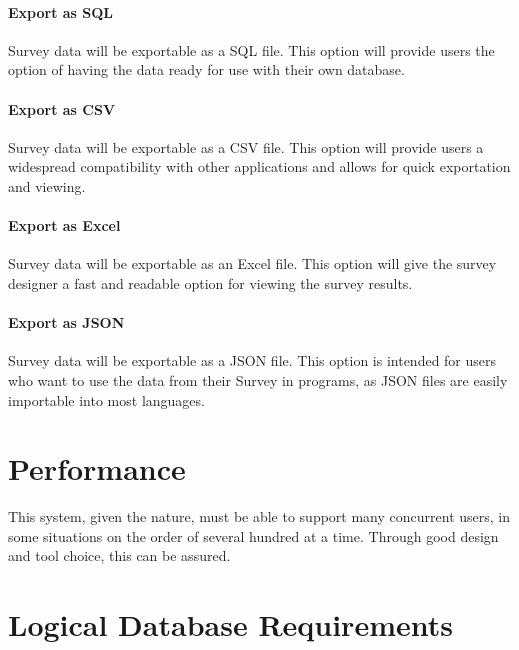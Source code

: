 \documentclass[10pt,letter]{report}
\def\hl#1{#1}
\begin{document}
\paragraph{Export as SQL}
\label{sec:export-sql}

Survey data will be exportable as a \hl{SQL} file. This option will
provide users the option of having the data ready for use with their
own database.

\paragraph{Export as CSV}
\label{sec:export-csv}

Survey data will be exportable as a \hl{CSV} file. This option will provide
users a widespread compatibility with other applications and allows
for quick exportation and viewing.

\paragraph{Export as Excel}
\label{sec:export-excel}

Survey data will be exportable as an \hl{Excel} file. This option will give
the survey designer a fast and readable option for viewing the survey
results.

\paragraph{Export as JSON}
\label{sec:export-json}

Survey data will be exportable as a \hl{JSON} file. This option is
intended for users who want to use the data from their Survey in
programs, as JSON files are easily importable into most languages.

\section{Performance}
\label{sec:performance}

This system, given the nature, must be able to support many concurrent
users, in some situations on the order of several hundred at a time.
Through good design and tool choice, this can be assured.

\section{Logical Database Requirements}
\label{sec:logic-datab-requ}
\end{document}
